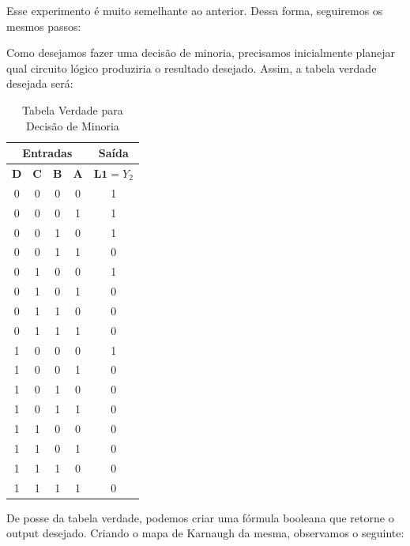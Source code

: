 \documentclass[12pt]{article}
\begin{document}
Esse experimento é muito semelhante ao anterior. Dessa forma, seguiremos os
mesmos passos:

Como desejamos fazer uma decisão de minoria, precisamos inicialmente planejar
qual circuito lógico produziria o resultado desejado. Assim, a tabela verdade desejada será:

\begin{table}[H]
    \centering
    \caption{Tabela Verdade para Decisão de Minoria}
    \begin{tabular}{|c|c|c|c|c|}\hline
    \multicolumn{4}{|c|}{Entradas} & \multicolumn{1}{|c|}{Saída} \\\hline
    \textbf{D} & \textbf{C} & \textbf{B} & \textbf{A} & $\textbf{L1}=Y_{2}$ \\\hline
    0 & 0 & 0 & 0 & 1 \\\hline
    0 & 0 & 0 & 1 & 1 \\\hline
    0 & 0 & 1 & 0 & 1 \\\hline
    0 & 0 & 1 & 1 & 0 \\\hline
    0 & 1 & 0 & 0 & 1 \\\hline
    0 & 1 & 0 & 1 & 0 \\\hline
    0 & 1 & 1 & 0 & 0 \\\hline
    0 & 1 & 1 & 1 & 0 \\\hline
    1 & 0 & 0 & 0 & 1 \\\hline
    1 & 0 & 0 & 1 & 0 \\\hline
    1 & 0 & 1 & 0 & 0 \\\hline
    1 & 0 & 1 & 1 & 0 \\\hline
    1 & 1 & 0 & 0 & 0 \\\hline
    1 & 1 & 0 & 1 & 0 \\\hline
    1 & 1 & 1 & 0 & 0 \\\hline
    1 & 1 & 1 & 1 & 0 \\\hline
    \end{tabular}\label{tab:decisao_minoria}
\end{table}

De posse da tabela verdade, podemos criar uma fórmula booleana que retorne o
output desejado. Criando o mapa de Karnaugh da mesma, observamos o seguinte:
\end{document}
